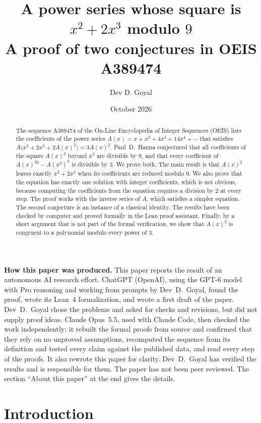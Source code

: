 \documentclass[11pt,a4paper]{article}
\title{A power series whose square is $x^2+2x^3$ modulo $9$\\[6pt]\large A proof of two conjectures in OEIS A389474}
\author{Dev D. Goyal}
\date{October 2026}
\theoremstyle{definition}
\theoremstyle{remark}
\begin{document}
\maketitle
\begin{abstract}
The sequence A389474 of the On-Line Encyclopedia of Integer Sequences (OEIS) lists the coefficients of the power series
$A(x)=x+x^2+4x^3+14x^4+\cdots$ that satisfies $A\bigl(x^2+2x^3+2A(x)^2\bigr)=3A(x)^2$. Paul~D.~Hanna conjectured that
all coefficients of the square $A(x)^2$ beyond $x^3$ are divisible by $9$, and that every coefficient of
$A(x)^{3k}-A(x^3)^k$ is divisible by $3$. We prove both. The main result is that $A(x)^2$ leaves exactly
$x^2+2x^3$ when its coefficients are reduced modulo $9$. We also prove that the equation has exactly one solution with
integer coefficients, which is not obvious, because computing the coefficients from the equation requires a division by
$2$ at every step. The proof works with the inverse series of $A$, which satisfies a simpler equation. The second
conjecture is an instance of a classical identity. The results have been checked by computer and proved formally in
the Lean proof assistant. Finally, by a short argument that is not part of the formal verification, we show
that $A(x)^2$ is congruent to a polynomial modulo every power of $3$.
\end{abstract}
\begin{center}\begin{minipage}{0.88\linewidth}\small
\textbf{How this paper was produced.} This paper reports the result of an autonomous AI research effort.
ChatGPT (OpenAI), using the GPT-6 model with Pro reasoning and working from prompts by Dev~D.~Goyal, found the proof, wrote its Lean~4 formalization, and wrote a first draft of the paper.
Dev~D.~Goyal chose the problems and asked for checks and revisions, but did not supply proof ideas.
Claude Opus~5.5, used with Claude Code, then checked the work independently: it rebuilt the formal proofs from
source and confirmed that they rely on no unproved assumptions, recomputed the sequence from its definition and tested
every claim against the published data, and read every step of the proofs. It also rewrote this paper for clarity.
Dev~D.~Goyal has verified the results and is responsible for them. The paper has not been peer reviewed.
The section ``About this paper'' at the end gives the details.
\end{minipage}\end{center}

\section{Introduction}
\end{document}
